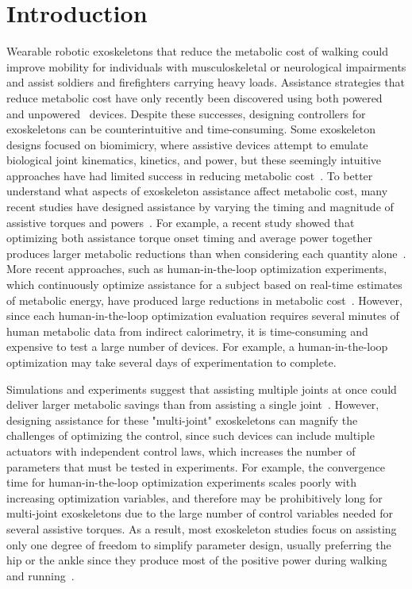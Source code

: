 \documentclass[10pt,letterpaper]{article}
\begin{document}
\section*{Introduction}
Wearable robotic exoskeletons that reduce the metabolic cost of walking could improve mobility for individuals with musculoskeletal or neurological impairments and assist soldiers and firefighters carrying heavy loads. Assistance strategies that reduce metabolic cost have only recently been discovered using both powered~\cite{Sawicki:2008, Malcolm:2013, Mooney:2014, Sawicki:2020} and unpowered~\cite{Collins:2015} devices. Despite these successes, designing controllers for exoskeletons can be counterintuitive and time-consuming. Some exoskeleton designs focused on biomimicry, where assistive devices attempt to emulate biological joint kinematics, kinetics, and power, but these seemingly intuitive approaches have had limited success in reducing metabolic cost~\cite{vanDijk:2011, Cornwall:2015}. To better understand what aspects of exoskeleton assistance affect metabolic cost, many recent studies have designed assistance by varying the timing and magnitude of assistive torques and powers~\cite{Zhang:2017, Ding:2016, Ding:2018, Galle:2017, Quinlivan:2017}. For example, a recent study showed that optimizing both assistance torque onset timing and average power together produces larger metabolic reductions than when considering each quantity alone~\cite{Galle:2017}. More recent approaches, such as human-in-the-loop optimization experiments, which continuously optimize assistance for a subject based on real-time estimates of metabolic energy, have produced large reductions in metabolic cost~\cite{Zhang:2017, Ding:2018}. However, since each human-in-the-loop optimization evaluation requires several minutes of human metabolic data from indirect calorimetry, it is time-consuming and expensive to test a large number of devices. For example, a human-in-the-loop optimization may take several days of experimentation to complete.

Simulations and experiments suggest that assisting multiple joints at once could deliver larger metabolic savings than from assisting a single joint~\cite{Uchida:2016, Malcolm:2018, Bryan:2020}. However, designing assistance for these "multi-joint" exoskeletons can magnify the challenges of optimizing the control, since such devices can include multiple actuators with independent control laws, which increases the number of parameters that must be tested in experiments. For example, the convergence time for human-in-the-loop optimization experiments scales poorly with increasing optimization variables, and therefore may be prohibitively long for multi-joint exoskeletons due to the large number of control variables needed for several assistive torques. As a result, most exoskeleton studies focus on assisting only one degree of freedom to simplify parameter design, usually preferring the hip or the ankle since they produce most of the positive power during walking and running~\cite{Winter:1991, Novacheck:1998, Farris:2012, Sawicki:2020}.
\end{document}
